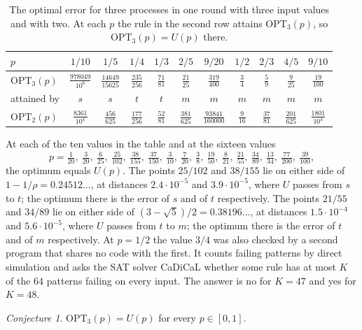 \documentclass[11pt]{article}
\theoremstyle{remark}
\newtheorem{conjecture}[theorem]{Conjecture}
\newcommand{\OPT}{\mathrm{OPT}}
\begin{document}
\begin{table}[tbp]
\centering
\begin{tabular}{lcccccccccc}
\toprule
$p$ & $1/10$ & $1/5$ & $1/4$ & $1/3$ & $2/5$ & $9/20$ & $1/2$ & $2/3$ & $4/5$ & $9/10$\\
\midrule
$\OPT_3(p)$ & $\frac{978049}{10^6}$ & $\frac{14649}{15625}$ & $\frac{235}{256}$ & $\frac{71}{81}$ & $\frac{21}{25}$ & $\frac{319}{400}$ & $\frac34$ & $\frac59$ & $\frac9{25}$ & $\frac{19}{100}$\\
attained by & $s$ & $s$ & $t$ & $t$ & $m$ & $m$ & $m$ & $m$ & $m$ & $m$\\
$\OPT_2(p)$ & $\frac{8361}{10^4}$ & $\frac{456}{625}$ & $\frac{177}{256}$ & $\frac{52}{81}$ & $\frac{381}{625}$ & $\frac{93841}{160000}$ & $\frac9{16}$ & $\frac{37}{81}$ & $\frac{201}{625}$ & $\frac{1801}{10^4}$\\
\bottomrule
\end{tabular}
\caption{The optimal error for three processes in one round with three input values and with two. At each $p$ the rule in the second row attains $\OPT_3(p)$, so $\OPT_3(p)=U(p)$ there.}\label{tab:three}
\end{table}

At each of the ten values in the table and at the sixteen values
\[
p=\tfrac1{20},\ \tfrac3{20},\ \tfrac6{25},\ \tfrac{25}{102},\ \tfrac{38}{155},\ \tfrac{37}{150},\ \tfrac3{10},\ \tfrac7{20},\ \tfrac38,\ \tfrac{19}{50},\ \tfrac8{21},\ \tfrac{21}{55},\ \tfrac{34}{89},\ \tfrac{13}{34},\ \tfrac{77}{200},\ \tfrac{39}{100},
\]
the optimum equals $U(p)$. The points $25/102$ and $38/155$ lie on either side of $1-1/\rho=0.24512\dots$, at distances $2.4\cdot10^{-5}$ and $3.9\cdot10^{-5}$, where $U$ passes from $s$ to $t$; the optimum there is the error of $s$ and of $t$ respectively. The points $21/55$ and $34/89$ lie on either side of $(3-\sqrt5)/2=0.38196\dots$, at distances $1.5\cdot10^{-4}$ and $5.6\cdot10^{-5}$, where $U$ passes from $t$ to $m$; the optimum there is the error of $t$ and of $m$ respectively. At $p=1/2$ the value $3/4$ was also checked by a second program that shares no code with the first. It counts failing patterns by direct simulation and asks the SAT solver CaDiCaL whether some rule has at most $K$ of the $64$ patterns failing on every input. The answer is no for $K=47$ and yes for $K=48$.

\begin{conjecture}\label{conj:three}
$\OPT_3(p)=U(p)$ for every $p\in[0,1]$.
\end{conjecture}
\end{document}
